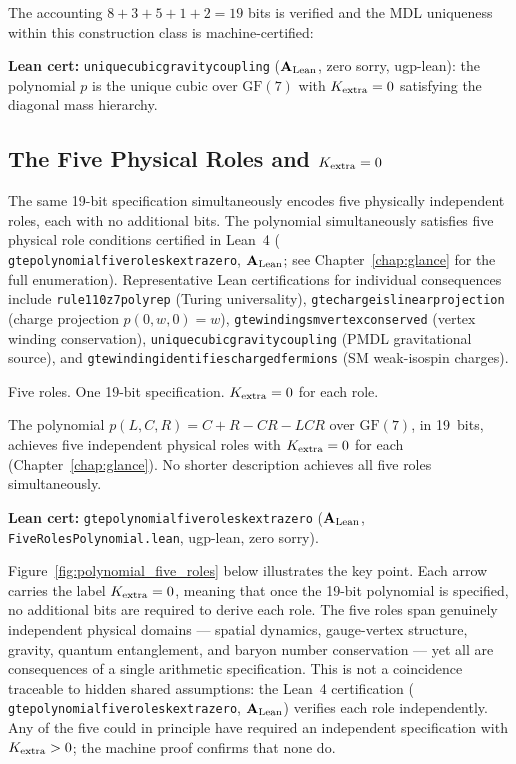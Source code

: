 \documentclass[11pt,openany]{book}
\theoremstyle{remark}
\newcommand{\lean}[1]{%
  \penalty-100
  \begingroup\def\_{\textunderscore\allowbreak}\texttt{#1}\endgroup}
\newcommand{\poly}{p(L,C,R)}
\newcommand{\CatAL}{\ensuremath{\textbf{A}_{\rm Lean}}}
\begin{document}
\noindent
The accounting $8+3+5+1+2 = 19$ bits is verified and the MDL uniqueness within this
construction class is machine-certified:

\textbf{Lean cert:} \lean{unique\_cubic\_gravity\_coupling} (\CatAL, zero sorry,
ugp-lean): the polynomial $p$ is the unique cubic over $\mathrm{GF}(7)$ with
$K_{\rm extra} = 0$ satisfying the diagonal mass hierarchy.

\subsection*{The Five Physical Roles and $K_{\rm extra} = 0$}

The same 19-bit specification simultaneously encodes five physically independent roles,
each with no additional bits.
The polynomial simultaneously satisfies five physical role conditions certified in
Lean~4 (\lean{gte\_polynomial\_five\_roles\_k\_extra\_zero}, \CatAL; see
Chapter~\ref{chap:glance} for the full enumeration).
Representative Lean certifications for individual consequences include
\lean{rule110\_z7\_poly\_rep} (Turing universality),
\lean{gte\_charge\_is\_linear\_projection} (charge projection $p(0,w,0)=w$),
\lean{gte\_winding\_sm\_vertex\_conserved} (vertex winding conservation),
\lean{unique\_cubic\_gravity\_coupling} (PMDL gravitational source), and
\lean{gte\_winding\_identifies\_charged\_fermions} (SM weak-isospin charges).

Five roles. One 19-bit specification. $K_{\rm extra} = 0$ for each role.

\begin{tcolorbox}[colback=orange!5,colframe=orange!60,
  title={Result: Single-Source Principle (\CatAL)}]
The polynomial $\poly = C+R-CR-LCR$ over $\mathrm{GF}(7)$, in 19~bits, achieves five
independent physical roles with $K_{\rm extra} = 0$ for each
(Chapter~\ref{chap:glance}).
No shorter description achieves all five roles simultaneously.

\smallskip\noindent
\textbf{Lean cert:} \lean{gte\_polynomial\_five\_roles\_k\_extra\_zero} (\CatAL,
\texttt{FiveRolesPolynomial.lean}, ugp-lean, zero sorry).
\end{tcolorbox}

\noindent
Figure~\ref{fig:polynomial_five_roles} below illustrates the key point.
Each arrow carries the label $K_{\rm extra} = 0$, meaning that once the 19-bit
polynomial is specified, no additional bits are required to derive each role.
The five roles span genuinely independent physical domains --- spatial dynamics,
gauge-vertex structure, gravity, quantum entanglement, and baryon number conservation
--- yet all are consequences of a single arithmetic specification.
This is not a coincidence traceable to hidden shared assumptions: the
Lean~4 certification (\lean{gte\_polynomial\_five\_roles\_k\_extra\_zero}, \CatAL)
verifies each role independently.
Any of the five could in principle have required an independent specification
with $K_{\rm extra} > 0$; the machine proof confirms that none do.
\end{document}
